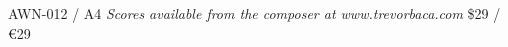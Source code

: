\documentclass{article}
\begin{document}
\null \vfill

AWN-012 / A4 \hfill
\textit{Scores available from the composer at www.trevorbaca.com}
\hfill \$29 / \euro 29
\end{document}
